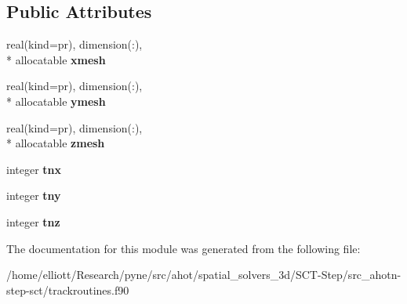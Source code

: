 \subsection*{Public Attributes}
\begin{DoxyCompactItemize}
\item 
\hypertarget{classtracking__routines_a07524d1ef073199189df2a7f7f3fa5ec}{real(kind=pr), dimension(\-:), \\*
allocatable {\bfseries xmesh}}\label{classtracking__routines_a07524d1ef073199189df2a7f7f3fa5ec}

\item 
\hypertarget{classtracking__routines_aa5a1a25601052aa53c95a49839c7caa6}{real(kind=pr), dimension(\-:), \\*
allocatable {\bfseries ymesh}}\label{classtracking__routines_aa5a1a25601052aa53c95a49839c7caa6}

\item 
\hypertarget{classtracking__routines_ad21d114b4233969bbe2985552ff3ddd3}{real(kind=pr), dimension(\-:), \\*
allocatable {\bfseries zmesh}}\label{classtracking__routines_ad21d114b4233969bbe2985552ff3ddd3}

\item 
\hypertarget{classtracking__routines_acbc37a14a1ab16ecf181d9cbc037072d}{integer {\bfseries tnx}}\label{classtracking__routines_acbc37a14a1ab16ecf181d9cbc037072d}

\item 
\hypertarget{classtracking__routines_a1db31d3726c30cc34544ceadeb7dc3d4}{integer {\bfseries tny}}\label{classtracking__routines_a1db31d3726c30cc34544ceadeb7dc3d4}

\item 
\hypertarget{classtracking__routines_a22f4df48f39b50f5ceab6c0c4a076555}{integer {\bfseries tnz}}\label{classtracking__routines_a22f4df48f39b50f5ceab6c0c4a076555}

\end{DoxyCompactItemize}


The documentation for this module was generated from the following file\-:\begin{DoxyCompactItemize}
\item 
/home/elliott/\-Research/pyne/src/ahot/spatial\-\_\-solvers\-\_\-3d/\-S\-C\-T-\/\-Step/src\-\_\-ahotn-\/step-\/sct/trackroutines.\-f90\end{DoxyCompactItemize}
